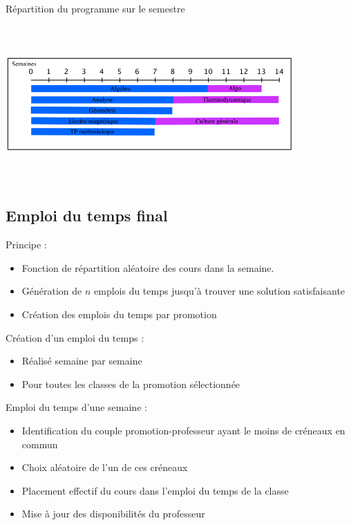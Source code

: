 \documentclass{beamer}
\begin{document}
\begin{frame}
Répartition du programme sur le semestre
\begin{center}
\includegraphics [width=110mm, height=60mm]{RepartitionSemestre.png}
\end{center}
\end{frame}

\subsection{Emploi du temps final}

\begin{frame}
Principe :
\begin{itemize}
\item Fonction de répartition aléatoire des cours dans la semaine.\\
\item Génération de $n$ emplois du temps jusqu'à trouver une solution satisfaisante\\ 
\item Création des emplois du temps par promotion
\end{itemize}
\end{frame}

\begin{frame}
Création d'un emploi du temps :\\
\begin{itemize}
\item Réalisé semaine par semaine
\item Pour toutes les classes de la promotion sélectionnée
\end{itemize}
\end{frame}

\begin{frame}
Emploi du temps d'une semaine :
\begin{itemize}
\item Identification du couple promotion-professeur ayant le moins de créneaux en commun
\item Choix aléatoire de l'un de ces créneaux
\item Placement effectif du cours dans l'emploi du temps de la classe
\item Mise à jour des disponibilités du professeur
\end{itemize}
\end{frame}
\end{document}
